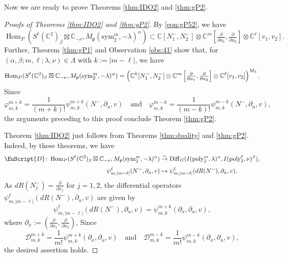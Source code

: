 \documentclass[reqno,11pt]{amsart}
\theoremstyle{remark}
\numberwithin{equation}{section}
\newcommand{\gb}{\beta}
\newcommand{\ga}{\alpha}
\newcommand{\gL}{\Lambda}
\newcommand{\fp}{{\mathfrak p}}
\newcommand{\C}{\mathbb{C}}
\newcommand{\Cal}{\mathcal}
\newcommand{\Hom}{\operatorname{Hom}}
\newcommand{\poly}{\mathrm{poly}}
\newcommand{\Diff}{\mathrm{Diff}}
\newcommand{\sym}{\mathrm{sym}}
\begin{document}
Now we are ready to prove Theorems \ref{thm:IDO2} and \ref{thm:gP2}.

\begin{proof}[Proofs of Theorems \ref{thm:IDO2} and \ref{thm:gP2}]
By \eqref{eqn:gP52}, we have 
\begin{equation*}
\Hom_P(S^\ell(\C^2)_\beta \boxtimes \C_{-\nu} , 
 M_\fp(\sym_2^m, -\lambda)^\ga)
\subset
\C[N^-_1, N^-_2]
\otimes \C^m\left[\tfrac{\partial}{\partial u_1}, \tfrac{\partial}{\partial u_2}\right]
\otimes \C^\ell[v_1, v_2].
\end{equation*}
Further,
Theorem \ref{thm:gP1} and Observation \ref{obs:41} show that,
for $(\ga, \gb; m,\ell; \lambda,\nu) \in \gL$ with $k:=|m-\ell|$, we have 
\begin{equation}
\Hom_P(S^\ell(\C^2)_\beta \boxtimes \C_{-\nu} , 
 M_\fp(\sym_2^m, -\lambda)^\ga)
 =
\left(\C^k[N^-_1, N^-_2]
\otimes \C^m\left[\tfrac{\partial}{\partial u_1}, \tfrac{\partial}{\partial u_2}\right]
\otimes \C^\ell[v_1, v_2]\right)^{M_0}. \label{eqn:P53}\\[3pt]
\end{equation}
Since
\begin{equation*}
\varphi^{m+k}_{m,k}=\frac{1}{(m+k)!}\psi^{m+k}_{m,k}(N^-,\partial_u,v)
\quad
\text{and}
\quad \varphi^{m-k}_{m,k}=\frac{1}{(m-k)!}\psi^{m-k}_{m,k}(N^-,\partial_u,v),
\end{equation*}
the arguments preceding to this proof conclude Theorem \ref{thm:gP2}.

Theorem \ref{thm:IDO2} just follows from 
Theorems \ref{thm:duality} 
and \ref{thm:gP2}. Indeed, by these theorems, we have 
\begin{align*}
\EuScript{D}
\colon
\Hom_P(S^\ell(\C^2)_\beta \boxtimes \C_{-\nu} , 
 M_\fp(\sym_2^m, -\lambda)^\ga)
&\stackrel{\sim}{\to}
\Diff_G(I(\poly_2^m, \lambda)^\ga, I(\poly_2^\ell,  \nu)^\beta),\\[3pt]
\psi^{\ell}_{m,|m-\ell|}(N^-,\partial_u,v) 
&\mapsto
\psi^{\ell}_{m,|m-\ell|}(dR(N^-),\partial_u,v).
\end{align*}
As $dR(N_j^-) = \tfrac{\partial}{\partial x_j}$ for $j=1,2$,
the differential operators $\psi^{\ell}_{m,|m-\ell|}(dR(N^-),\partial_u,v)$ are given by
\begin{equation*}
\psi^{\ell}_{m,|m-\ell|}(dR(N^-),\partial_u,v)=
\psi^{m+k}_{m,k}(\partial_x,\partial_u,v),
\end{equation*}
where 
$\partial_x:=\left(\tfrac{\partial}{\partial x_1}, \tfrac{\partial}{\partial x_2}\right)$, 
Since 
\begin{equation*}
\Cal{D}^{m+k}_{m,k}=\frac{1}{m!}\psi^{m+k}_{m,k}(\partial_x,\partial_u,v)
\quad
\text{and}
\quad \Cal{D}^{m-k}_{m,k}=\frac{1}{m!}\psi^{m-k}_{m,k}(\partial_x,\partial_u,v),
\end{equation*}
the desired assertion holds.
\end{proof}
\end{document}
